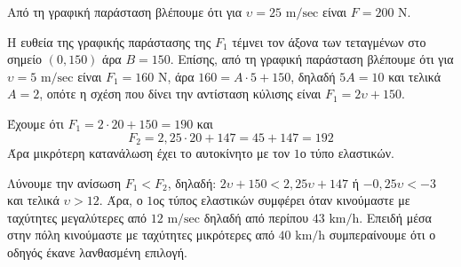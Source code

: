 
\begin{alist}
\item
\begin{rlist}
\item Από τη γραφική παράσταση βλέπουμε ότι για $\upsilon = 25\text{ m/sec}$ είναι $F = 200\text{ N}$.
\item Η ευθεία της γραφικής παράστασης της $F_1$ τέμνει τον άξονα των τεταγμένων στο
σημείο $(0, 150)$ άρα $B = 150$. Επίσης, από τη γραφική παράσταση βλέπουμε ότι για
$\upsilon = 5\text{ m/sec}$ είναι $F_1 = 160\text{ N}$, άρα $160 = A \cdot 5 + 150$, δηλαδή $5A = 10$ και τελικά
$A = 2$, οπότε η σχέση που δίνει την αντίσταση κύλισης είναι $F_1 = 2\upsilon + 150$.
\end{rlist}

\item
\begin{rlist}
\item Έχουμε ότι
$F_1 = 2 \cdot 20 + 150 = 190$
και
\[F_2 = 2,25 \cdot 20 + 147 = 45 + 147 = 192\]
Άρα μικρότερη κατανάλωση έχει το αυτοκίνητο με τον $1$ο τύπο ελαστικών.
\item Λύνουμε την ανίσωση $F_1 < F_2$, δηλαδή:
$2\upsilon + 150 < 2,25\upsilon + 147$
ή
$-0,25\upsilon < -3$
και τελικά
$\upsilon > 12$.
Άρα, ο $1$ος τύπος ελαστικών συμφέρει όταν κινούμαστε με ταχύτητες μεγαλύτερες από
$12\text{ m/sec}$ δηλαδή από περίπου $43\text{ km/h}$. Επειδή μέσα στην πόλη κινούμαστε με ταχύτητες
μικρότερες από $40\text{ km/h}$ συμπεραίνουμε ότι ο οδηγός έκανε λανθασμένη επιλογή.
\end{rlist}
\end{alist}

